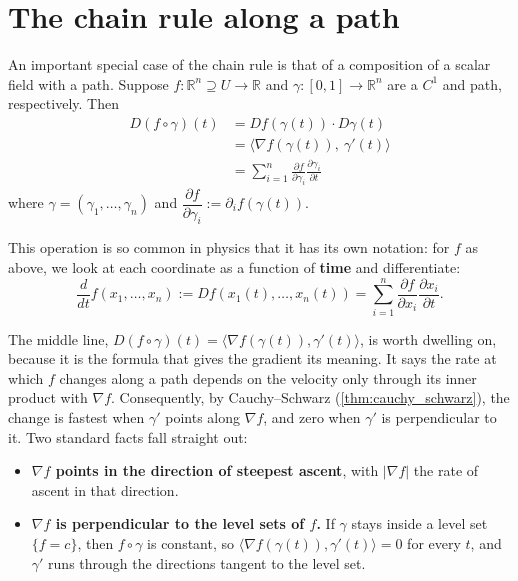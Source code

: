 
\section{The chain rule along a path}
\label{sec:chain_rule_along_path}

An important special case of the chain rule is that of a composition of a scalar field with a
path. Suppose $f : \mathbb{R}^n \supseteq U \to \mathbb{R}$ and
$\gamma : [0,1]\to\mathbb{R}^n$ are a $C^1$   and
path, respectively. Then
\[
\begin{aligned}
D(f\circ\gamma)(t) &= Df(\gamma(t))\cdot D\gamma(t) \\
&= \langle \nabla f(\gamma(t)),\ \gamma'(t)\rangle \\
&= \sum_{i=1}^{n} \frac{\partial f}{\partial \gamma_i}\frac{\partial \gamma_i}{\partial t}
\end{aligned}
\]
where $\gamma = (\gamma_1,\dots,\gamma_n)$ and
$\dfrac{\partial f}{\partial \gamma_i} := \partial_i f(\gamma(t))$.

This operation is so common in physics that it has its own notation: for $f$ as above, we look at
each coordinate as a function of \textbf{time} and differentiate:
\[\frac{d}{dt}f(x_1,\dots,x_n) := Df(x_1(t),\dots,x_n(t)) = \sum_{i=1}^{n}\frac{\partial f}{\partial x_i}\frac{\partial x_i}{\partial t}.\]

The middle line, $D(f\circ\gamma)(t) = \langle\nabla f(\gamma(t)),\gamma'(t)\rangle$, is worth
dwelling on, because it is the formula that gives the gradient its meaning. It says the rate at
which $f$ changes along a path depends on the velocity only through its inner product with
$\nabla f$. Consequently, by Cauchy--Schwarz (\cref{thm:cauchy_schwarz}), the change is fastest
when $\gamma'$ points along $\nabla f$, and zero when $\gamma'$ is perpendicular to it. Two
standard facts fall straight out:

\begin{itemize}
  \item \textbf{$\nabla f$ points in the direction of steepest ascent}, with
    $|\nabla f|$ the rate of ascent in that direction.
  \item \textbf{$\nabla f$ is perpendicular to the level sets of $f$.} If $\gamma$ stays inside
    a level set $\{f = c\}$, then $f\circ\gamma$ is constant, so
    $\langle\nabla f(\gamma(t)),\gamma'(t)\rangle = 0$ for every $t$, and $\gamma'$ runs through
    the directions tangent to the level set.
\end{itemize}

